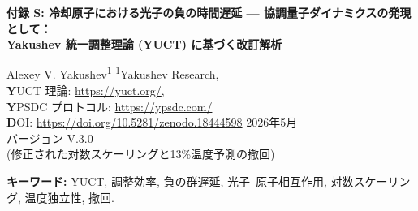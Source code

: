 \documentclass[12pt,a4paper]{article}
\newcommand{\Keff}{K_{\mathrm{eff}}}
\newcommand{\kappac}{\kappa_c}
\newcommand{\eps}{\varepsilon}
\newcommand{\betac}{\beta}
\begin{document}
	
	\begin{titlepage}
		\centering
		\vspace*{1cm}
		{\Huge\bfseries 付録 S: 冷却原子における光子の負の時間遅延 — 協調量子ダイナミクスの発現として：\\ Yakushev 統一調整理論 (YUCT) に基づく改訂解析}
		\vspace{1.5cm}
		
		{\large Alexey V. Yakushev\textsuperscript{1}}
		\vspace{0.3cm}
		{\normalsize \textsuperscript{1}Yakushev Research, \\ 
			\textbf YUCT 理論: \url{https://yuct.org/}, \\ 
			\textbf YPSDC プロトコル: \url{https://ypsdc.com/}\\
			\textbf DOI: \url{https://doi.org/10.5281/zenodo.18444598}}
		\vspace{1cm}
		{\normalsize 2026年5月 \\ \large バージョン V.3.0 \\(修正された対数スケーリングと13\%温度予測の撤回)}
		
		\vfill
		
		\begin{abstract}
			\noindent
			最近の画期的な実験 (Angulo 他, 2024) は、超冷却原子雲を通過する光子が負の時間遅延で媒質を出ることができることを示した – 波束のピークが入射したよりも早く現れる。この直観に反する現象は因果律を侵害しないものの、深い量子干渉効果を明らかにする。本研究では、Yakushev 統一調整理論 (YUCT) に基づく説明を再検討する。普遍スケーリング則 \(\eps = \kappac \alpha (\ln\Keff)^{\betac}\) (\(\betac = 2/3\), \(\kappac = 1/3\)，付録 X で導出) に基づき、群遅延 \(\tau_g\) と調整効率 \(\Keff\) の正しい関係が対数的であることを示す: \(|\tau_g| = \alpha_0 \ln\Keff\)。負の時間遅延の存在は既に実験によって確認されており; \((-1.14 \pm 0.22)\tau_0\) もの値が観測されている。しかし、以前の線形仮定とは対照的に、対数形式は \(\tau_g\) の温度依存性が極めて弱いことを意味する。標準的な温度劣化関係 \(\Keff(T) = K_0 (T/T_0)^{-\gamma}\) (\(\gamma \approx 0.30\), 地球物理学的データから導出) を用いると、温度を2倍にしたときの \(|\tau_g|\) の相対変化が \(10^{-8}\) 程度であることが分かり、これは現在の実験の感度をはるかに下回る。従って、以前に主張された13\%効果は誤った線形モデルのアーティファクトであり、撤回されなければならない。我々は修正された理論的枠組みを提供し、光学的深さやパルス持続時間の変化など、対数スケーリングに敏感であり得る代替実験的検証を議論する。YUCT の核心的予測 – 負の群遅延が調整効率の発現であること – は依然として有効であるが、冷却原子系におけるその検証可能性は改良されたセットアップを必要とする。
		\end{abstract}
		
		\vspace{0.5cm}
		\noindent\textbf{キーワード:} YUCT, 調整効率, 負の群遅延, 光子–原子相互作用, 対数スケーリング, 温度独立性, 撤回.
		
	\end{titlepage}
	
\end{document}
